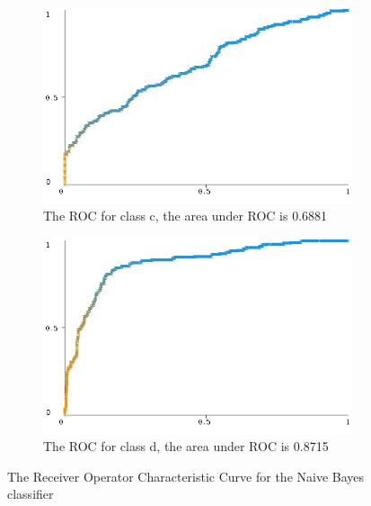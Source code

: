\documentclass[10pt]{article}
\begin{document}
\begin{figure}[h]
\begin{subfigure}[b]{0.475\textwidth}
        \includegraphics[width=\textwidth]{bayes_roc/roc_curve_c.jpg}
        \caption[]%
        {{\small The ROC for class c, the area under ROC is 0.6881}}    
        \label{fig:bayes roc curve class c}
    \end{subfigure}
    \quad
    \begin{subfigure}[b]{0.475\textwidth}   
        \centering 
        \includegraphics[width=\textwidth]{bayes_roc/roc_curve_e(d).jpg}
        \caption[]%
        {{\small The ROC for class d, the area under ROC is 0.8715}}    
        \label{fig:bayes roc curve class d}
    \end{subfigure}
    \caption[ ]
    {\small The Receiver Operator Characteristic Curve for the Naive Bayes classifier} 
    \label{fig:naive bayes roc curves}
\end{figure}
\end{document}
